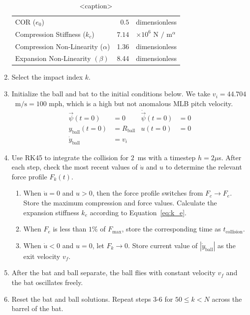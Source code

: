 \documentclass[linenumbers]{aastex7}
\newcommand{\ball}{_\mathrm{ball}}
\begin{document}
\begin{enumerate}
\begin{table}[h]
\begin{tabular}{|lr|l|}
               COR ($e_0$)                          & $0.5$          & dimensionless \\ Compression Stiffness ($k_c$) & $7.14$ & $\times 10^6$ N $/$ m$^\alpha$
               \\ Compression Non-Linearity ($\alpha$) & 1.36 & dimensionless \\ Expansion Non-Linearity $(\beta)$ & 8.44 & dimensionless \\\hline\end{tabular}
		      \caption{<caption>}
		      \label{tab:ballparams}
	      \end{table}
	\item Select the impact index $k$.
	\item Initialize the ball and bat to the initial conditions below. We take $v_i = 44.704$~$\mathrm{m}/\mathrm{s} = 100$ mph, which is a high but not anomalous MLB pitch     velocity.
	      \begin{align}\label{eq:inits}
		      \vec{\psi}(t = 0) & = 0      & \dot{\vec{\psi}}(t = 0) & = 0 \\
		      y\ball (t = 0)    & = R\ball & u(t = 0)                & = 0 \\
		      \dot{y}\ball\,    & = v_i
	      \end{align}
	\item Use RK45 to integrate the collision for $2$~ms with a timestep $h = 2\mu$s. After each step, check the most recent values of $\dot{u}$ and $u$ to determine the relevant force profile $F_k(t)$.
	      \begin{enumerate}
		      \item When $\dot{u} = 0$ and $u > 0$, then the force profile switches from $F_c \to F_e$. Store the maximum compression and force values. Calculate the expansion stiffness $k_e$ according to Equation~\ref{eq:k_e}.
		      \item When $F_e$ is less than $1\%$ of $F_\mathrm{max}$, store the corresponding time as $t_\mathrm{collision}$.
		      \item When $\dot{u} < 0$ and $u = 0$, let $F_k \to 0$. Store current value of $|\dot{y}\ball|$ as the exit velocity $v_f$.
	      \end{enumerate}
	\item After the bat and ball separate, the ball flies with constant velocity $v_f$ and the bat oscillates freely.
	\item Reset the bat and ball solutions. Repeat steps 3-6 for $50 \leq k < N$ across the barrel of the bat.
\end{enumerate}
\end{document}
